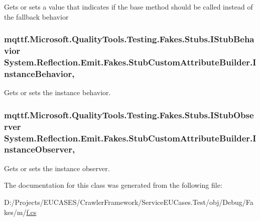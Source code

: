 Gets or sets a value that indicates if the base method should be called instead of the fallback behavior

\hypertarget{class_system_1_1_reflection_1_1_emit_1_1_fakes_1_1_stub_custom_attribute_builder_a2a491d3e7f3707fc9ab34d504b5c700a}{
\subsubsection[{Instance\-Behavior}]{\setlength{\rightskip}{0pt plus 5cm}mqttf.\-Microsoft.\-Quality\-Tools.\-Testing.\-Fakes.\-Stubs.\-I\-Stub\-Behavior System.\-Reflection.\-Emit.\-Fakes.\-Stub\-Custom\-Attribute\-Builder.\-Instance\-Behavior\hspace{0.3cm}{\ttfamily [get]}, {\ttfamily [set]}}}\label{class_system_1_1_reflection_1_1_emit_1_1_fakes_1_1_stub_custom_attribute_builder_a2a491d3e7f3707fc9ab34d504b5c700a}


Gets or sets the instance behavior.

\hypertarget{class_system_1_1_reflection_1_1_emit_1_1_fakes_1_1_stub_custom_attribute_builder_a417e058dc241226a06eb0db77d9ae0a6}{
\subsubsection[{Instance\-Observer}]{\setlength{\rightskip}{0pt plus 5cm}mqttf.\-Microsoft.\-Quality\-Tools.\-Testing.\-Fakes.\-Stubs.\-I\-Stub\-Observer System.\-Reflection.\-Emit.\-Fakes.\-Stub\-Custom\-Attribute\-Builder.\-Instance\-Observer\hspace{0.3cm}{\ttfamily [get]}, {\ttfamily [set]}}}\label{class_system_1_1_reflection_1_1_emit_1_1_fakes_1_1_stub_custom_attribute_builder_a417e058dc241226a06eb0db77d9ae0a6}


Gets or sets the instance observer.



The documentation for this class was generated from the following file\-:\begin{DoxyCompactItemize}
\item 
D\-:/\-Projects/\-E\-U\-C\-A\-S\-E\-S/\-Crawler\-Framework/\-Service\-E\-U\-Cases.\-Test/obj/\-Debug/\-Fakes/m/\hyperlink{m_2f_8cs}{f.\-cs}\end{DoxyCompactItemize}
